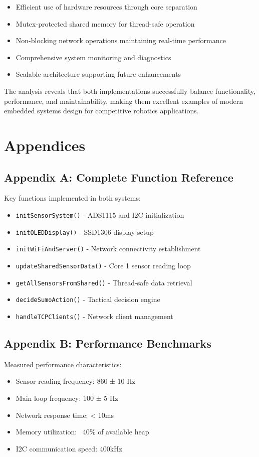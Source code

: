 \documentclass[12pt,a4paper]{article}
\begin{document}
\begin{itemize}
    \item Efficient use of hardware resources through core separation
    \item Mutex-protected shared memory for thread-safe operation
    \item Non-blocking network operations maintaining real-time performance
    \item Comprehensive system monitoring and diagnostics
    \item Scalable architecture supporting future enhancements
\end{itemize}

The analysis reveals that both implementations successfully balance functionality, performance, and maintainability, making them excellent examples of modern embedded systems design for competitive robotics applications.

\section{Appendices}

\subsection{Appendix A: Complete Function Reference}

Key functions implemented in both systems:

\begin{itemize}
    \item \texttt{initSensorSystem()} - ADS1115 and I2C initialization
    \item \texttt{initOLEDDisplay()} - SSD1306 display setup
    \item \texttt{initWiFiAndServer()} - Network connectivity establishment
    \item \texttt{updateSharedSensorData()} - Core 1 sensor reading loop
    \item \texttt{getAllSensorsFromShared()} - Thread-safe data retrieval
    \item \texttt{decideSumoAction()} - Tactical decision engine
    \item \texttt{handleTCPClients()} - Network client management
\end{itemize}

\subsection{Appendix B: Performance Benchmarks}

Measured performance characteristics:
\begin{itemize}
    \item Sensor reading frequency: 860 ± 10 Hz
    \item Main loop frequency: 100 ± 5 Hz
    \item Network response time: < 10ms
    \item Memory utilization: ~40\% of available heap
    \item I2C communication speed: 400kHz
\end{itemize}
\end{document}
